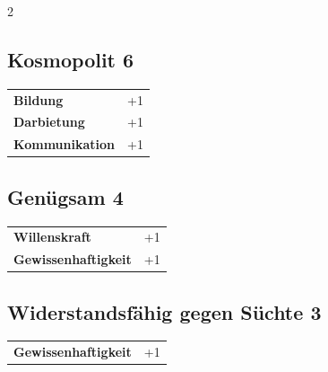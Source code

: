 \begin{multicols}{2}
\begin{tcolorbox}
    \subsection*{Kosmopolit \hfill \small{6 }}
    \tcblower




\begin{tabular}{@{}ll@{}}
    \textbf{Bildung} & +1\\
    \textbf{Darbietung} & +1\\
    \textbf{Kommunikation} & +1\\
\end{tabular}


\end{tcolorbox}

\begin{tcolorbox}
    \subsection*{Genügsam \hfill \small{4 }}
    \tcblower




\begin{tabular}{@{}ll@{}}
    \textbf{Willenskraft} & +1\\
    \textbf{Gewissenhaftigkeit} & +1\\
\end{tabular}


\end{tcolorbox}

\begin{tcolorbox}
    \subsection*{Widerstandsfähig gegen Süchte \hfill \small{3 }}
    \tcblower




\begin{tabular}{@{}ll@{}}
    \textbf{Gewissenhaftigkeit} & +1\\
\end{tabular}


\end{tcolorbox}
\end{multicols}
